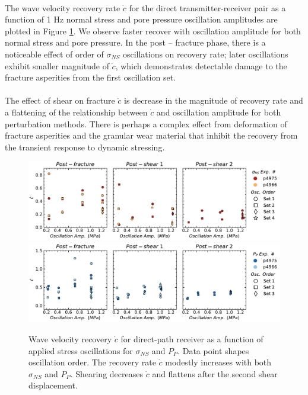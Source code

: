 \documentclass[letterpaper,10pt]{article}
\begin{document}
\paragraph{}
The wave velocity recovery rate $ \dot c $ for the direct transmitter-receiver pair as a function of 1 Hz normal stress and pore pressure oscillation amplitudes are plotted in Figure \ref{fig:c_recov}. We observe faster recover with oscillation amplitude for both normal stress and pore pressure. In the post -- fracture phase, there is a noticeable effect of order of $ \sigma_{NS} $ oscillations on recovery rate; later oscillations exhibit smaller magnitude of $ \dot c$, which demonstrates detectable damage to the fracture asperities from the first oscillation set.  

\paragraph{}
The effect of shear on fracture $ \dot c $ is decrease in the magnitude of recovery rate and a flattening of the relationship between $ \dot c $ and oscillation amplitude for both perturbation methods. There is perhaps a complex effect from deformation of fracture asperities and the granular wear material that inhibit the recovery from the transient response to dynamic stressing.  

\clearpage

\begin{figure}[ht]
	\centering
	\includegraphics[width=1\columnwidth]{c_recov_amp_NS}
	\includegraphics[width=1\columnwidth]{c_recov_amp_PP}
	\caption{Wave velocity recovery $ \dot c $ for direct-path receiver as a function of applied stress oscillations for $ \sigma_{NS} $ and $ P_P $. Data point shapes oscillation order. The recovery rate $ \dot c $ modestly increases with both $ \sigma_{NS} $ and $ P_P $. Shearing decreases $ \dot c $ and flattens after the second shear displacement. }
	\label{fig:c_recov}
\end{figure}
\end{document}
